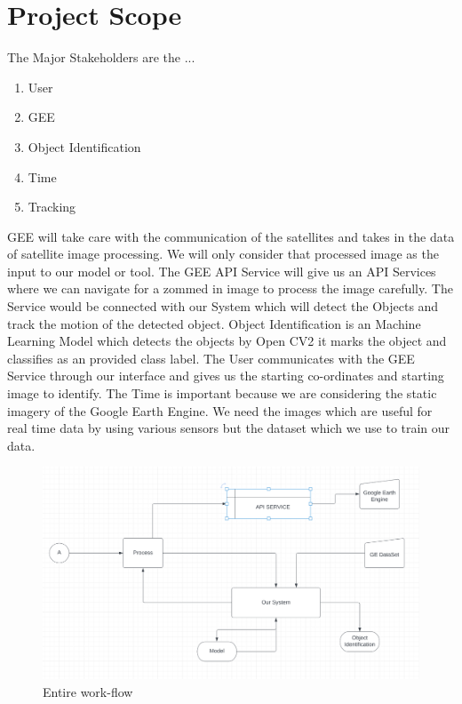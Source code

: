 	
	
	
	\section{Project Scope}
	The Major Stakeholders are the ... 
	\begin{enumerate}
		\item User
		\item GEE
		\item Object Identification
		\item Time
		\item Tracking 
	\end{enumerate}
	GEE will take care with the communication of the satellites and takes in the data of satellite image processing. We will only consider that processed image as the input to our model or tool. The GEE API Service will give us an API Services where we can navigate for a zommed in image to process the image carefully. The Service would be connected with our System which will detect the Objects and track the motion of the detected object.
	\newline
	Object Identification is an Machine Learning Model which detects the objects by Open CV2 it marks the object and classifies as an provided class label.
	\newline
	The User communicates with the GEE Service through our interface and gives us the starting co-ordinates and starting image to identify.
	\newline
	The Time is important because we are considering the static imagery of the Google Earth Engine. We need the images which are useful for real time data by using various sensors but the dataset which we use to train our data.
	\newline
	\begin{center}
		\begin{figure}
			\centering
			\includegraphics[scale=0.32]{images/2.png}
			\caption{Entire work-flow}
			\label{}
		\end{figure}
	\end{center}
	
